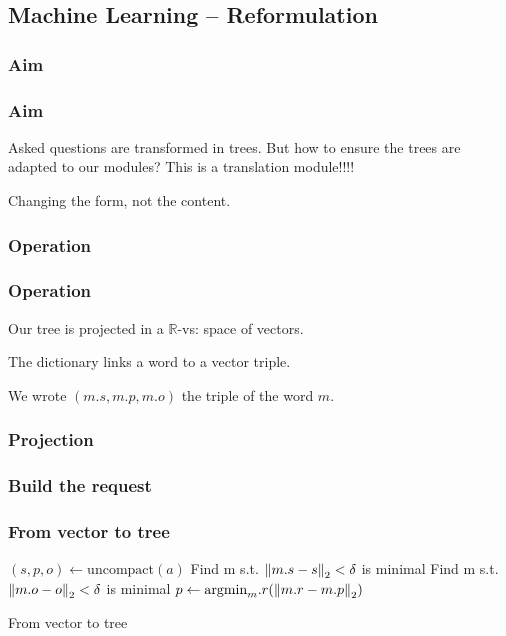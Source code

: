 \subsection{Machine Learning \--- Reformulation}

\subsubsection{Aim}

\begin{frame}
\frametitle{Aim}
Asked questions are transformed in trees. But how to ensure the trees are adapted to our modules?
\pause
This is a translation module!!!! %

Changing the form, not the content.
\end{frame}

\subsubsection{Operation}
\begin{frame}
\frametitle{Operation}
Our tree is projected in a $\mathbb{R}$-vs: space of vectors.

\begin{defi}
The dictionary links a word to a vector triple.

We wrote $(m.s,m.p,m.o)$ the triple of the word $m$. %
\end{defi}

\end{frame}

\begin{frame}
\frametitle{Projection}
\end{frame}

\subsubsection{Build the request}

\begin{frame}
\frametitle{From vector to tree}
\begin{algorithm}[H]
\DontPrintSemicolon  %
$(s,p,o) \gets \text{uncompact}(a)$\;
Find m s.t. $\left\|m.s-s\right\|_2<\delta$ is minimal \;
Find m s.t. $\left\|m.o-o\right\|_2<\delta$ is minimal \;
$p \gets \text{argmin}_m.r (\left\|m.r-m.p\right\|_2)$\;
\;
\caption{ From vector to tree }
\end{algorithm}

\end{frame}

